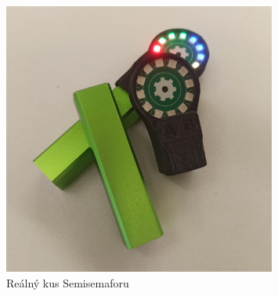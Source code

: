 \begin{figure}[!h]
  \centering
  \includegraphics[width=0.8\textwidth]{text/PraktickaCast/img/Real-Semisemafor.jpg}
  \caption{Reálný kus Semisemaforu}
  \label{Semisemafor-real}
\end{figure}